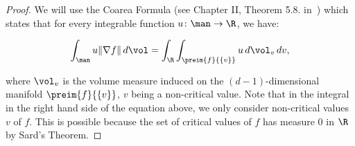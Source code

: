 \begin{proof}
We will use the Coarea Formula (see Chapter \RN{2}, Theorem 5.8. in~\cite{sakai1996riemannian}) which states that for every integrable function $u\colon\man\rightarrow\R$, we have:

$$\int_\man u\Vert\nabla f\Vert\,d\vol=\int_{\R}\int_{\preim{f}{\{v\}}}u\,d\vol_v\,dv,$$

where $\vol_v$ is the volume measure induced on the $(d-1)$-dimensional manifold $\preim{f}{\{v\}}$, $v$ being a non-critical value. Note that in the integral in the right hand side of the equation above, we only consider non-critical values $v$ of $f$. This is possible because the set of critical values of $f$ has measure 0 in $\R$ by Sard's Theorem.


\end{proof}

